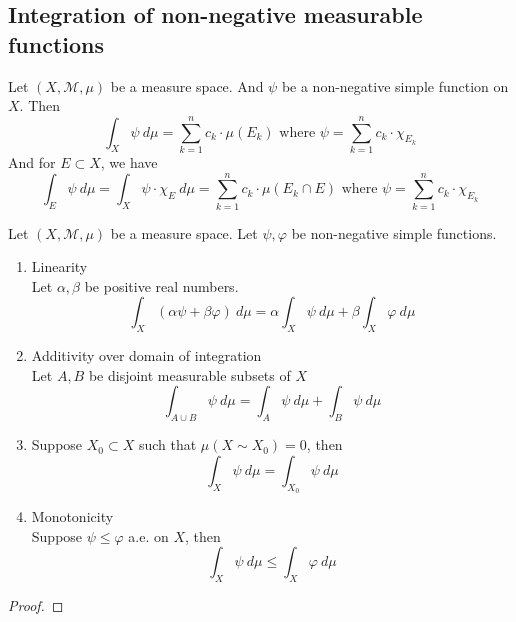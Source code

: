 
\subsection{Integration of non-negative measurable functions}
\begin{definition}
	Let $(X,\mathcal{M},\mu)$ be a measure space.
	And $\psi$ be a non-negative simple function on $X$.
	Then 
	\begin{equation}
		\int_X \psi\ d\mu = \sum_{k=1}^n c_k \cdot \mu(E_k) \text{ where } \psi = \sum_{k=1}^n c_k \cdot \chi_{E_k}
	\end{equation}
	And for $E \subset X$, we have
	\begin{equation}
		\int_E \psi\ d\mu = \int_X \psi \cdot \chi_E\ d\mu = \sum_{k=1}^n c_k \cdot \mu(E_k \cap E) \text{ where } \psi = \sum_{k=1}^n c_k \cdot \chi_{E_k}
	\end{equation}
\end{definition}

\begin{theorem}
	Let $(X,\mathcal{M},\mu)$ be a measure space.
	Let $\psi,\varphi$ be non-negative simple functions.
	\begin{enumerate}
		\item Linearity\\
			Let $\alpha, \beta$ be positive real numbers.
			\begin{equation}
				 \int_X (\alpha \psi + \beta \varphi) \ d\mu = \alpha \int_X \psi \ d\mu + \beta \int_X \varphi \ d\mu 
			\end{equation}
		\item Additivity over domain of integration\\
			Let $A,B$ be disjoint measurable subsets of $X$
			\begin{equation}
				\int_{A \cup B} \psi \ d\mu = \int_A \psi \ d\mu + \int_B \psi \ d\mu
			\end{equation}
		\item Suppose $X_0 \subset X$ such that $\mu(X \sim X_0) = 0$, then
			\begin{equation}
				\int_X \psi \ d\mu = \int_{X_0} \psi \ d\mu
			\end{equation}
		\item Monotonicity \\
			Suppose $\psi \le \varphi$ a.e. on $X$, then
			\begin{equation}
				\int_X \psi \ d\mu \le \int_X \varphi \ d\mu
			\end{equation}
	\end{enumerate}
\end{theorem}
\begin{proof}
\end{proof}

